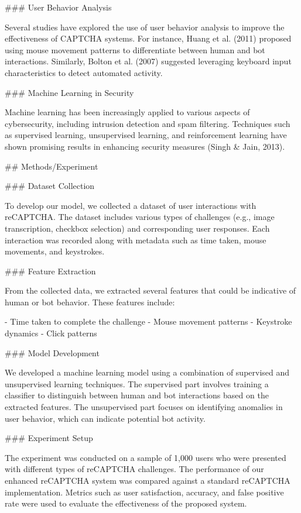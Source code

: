 ### User Behavior Analysis

Several studies have explored the use of user behavior analysis to improve the effectiveness of CAPTCHA systems. For instance, Huang et al. (2011) proposed using mouse movement patterns to differentiate between human and bot interactions. Similarly, Bolton et al. (2007) suggested leveraging keyboard input characteristics to detect automated activity.

### Machine Learning in Security

Machine learning has been increasingly applied to various aspects of cybersecurity, including intrusion detection and spam filtering. Techniques such as supervised learning, unsupervised learning, and reinforcement learning have shown promising results in enhancing security measures (Singh & Jain, 2013).

## Methods/Experiment

### Dataset Collection

To develop our model, we collected a dataset of user interactions with reCAPTCHA. The dataset includes various types of challenges (e.g., image transcription, checkbox selection) and corresponding user responses. Each interaction was recorded along with metadata such as time taken, mouse movements, and keystrokes.

### Feature Extraction

From the collected data, we extracted several features that could be indicative of human or bot behavior. These features include:

- Time taken to complete the challenge
- Mouse movement patterns
- Keystroke dynamics
- Click patterns

### Model Development

We developed a machine learning model using a combination of supervised and unsupervised learning techniques. The supervised part involves training a classifier to distinguish between human and bot interactions based on the extracted features. The unsupervised part focuses on identifying anomalies in user behavior, which can indicate potential bot activity.

### Experiment Setup

The experiment was conducted on a sample of 1,000 users who were presented with different types of reCAPTCHA challenges. The performance of our enhanced reCAPTCHA system was compared against a standard reCAPTCHA implementation. Metrics such as user satisfaction, accuracy, and false positive rate were used to evaluate the effectiveness of the proposed system.

